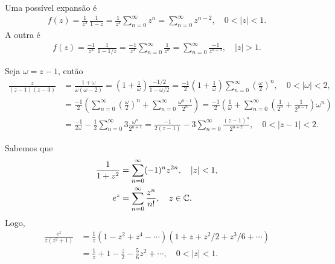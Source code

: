 \begin{questions}
%
\begin{solution}
Uma possível expansão é
    \begin{align*}
        f(z) = \frac{1}{z^2}\,\frac{1}{1 - z} = \frac{1}{z^2} \sum_{n=0}^{\infty} z^n = \sum_{n=0}^{\infty} z^{n-2}, \quad 0<|z|<1.
    \end{align*}
A outra é
    \begin{align*}
        f(z) = \frac{-1}{z^3}\,\frac{1}{1 - 1/z} = \frac{-1}{z^3} \sum_{n=0}^{\infty} \frac{1}{z^n} = \sum_{n=0}^{\infty} \frac{-1}{z^{n+3}}, \quad |z|>1.
    \end{align*}
\end{solution}

\setcounter{question}{22}
%
\begin{solution}
    Seja $\omega = z-1$, então
    \begin{align*}
        \frac{z}{(z-1)(z-3)} &= \frac{1+\omega}{\omega (\omega-2)}
            = \left(1 + \frac{1}{\omega}\right) \frac{-1/2}{1-\omega/2}
            = \frac{-1}{2} \left(1 + \frac{1}{\omega}\right) \sum_{n=0}^\infty \left(\frac{\omega}{2}\right)^n, \quad 0<|\omega|<2,\\
        &= \frac{-1}{2} \left(\sum_{n=0}^\infty \left(\frac{\omega}{2}\right)^n + \sum_{n=0}^\infty \frac{\omega^{n-1}}{2^n} \right) = \frac{-1}{2} \left(\frac{1}{\omega} + \sum_{n=0}^\infty \left(\frac{1}{2^n} + \frac{1}{2^{n-1}} \right)\omega^n \right) \\
        &= \frac{-1}{2\omega} - \frac{1}{2} \sum_{n=0}^\infty 3 \frac{\omega^n}{2^{n+1}} = \frac{-1}{2(z-1)} - 3 \sum_{n=0}^\infty \frac{(z-1)^n}{2^{n+2}}, \quad 0<|z-1|<2.
    \end{align*}
\end{solution}

%
\begin{solution}
    Sabemos que
    \begin{align*}
        \frac{1}{1+z^2} &= \sum_{n=0}^\infty (-1)^n z^{2n}, \quad |z| < 1,\\
        e^z &= \sum_{n=0}^\infty \frac{z^n}{n!}, \quad z\in{\mathbb C}.
    \end{align*}
    Logo,
    \begin{align*}
        \frac{e^z}{z(z^2+1)} &= \frac{1}{z} \left(1 - z^2 + z^4 - \cdots\right)     \left(1 + z + z^2/2 + z^3/6 + \cdots\right) \\
        &= \frac{1}{z} + 1 - \frac{z}{2} - \frac{5}{6} z^2 + \cdots, \quad 0<|z|<1.
    \end{align*}
\end{solution}

\end{questions}
